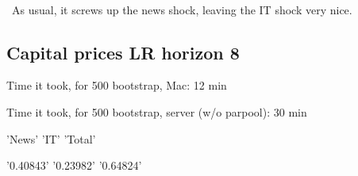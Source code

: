 \documentclass{article}
\def \ourFigPath {../}
\begin{document}
	\
	
	
	
	
	\begin{figure}[h!]
\centering
{} \hspace{.2in%
} 
\end{figure}

\
As usual, it screws up the news shock, leaving the IT shock very nice. 



\newpage
\subsection{Capital prices LR horizon 8}
\noindent Time it took, for 500 bootstrap, Mac: 12 min

\noindent  Time it took, for 500 bootstrap, server (w/o parpool): 30 min


\noindent  'News'       'IT'        'Total' 

\noindent  '0.40843'    '0.23982'    '0.64824'




\begin{figure}[h!]
	\centering
	 \hspace{.2in%
	} 
\end{figure}
	
	
		
	
	
\end{document}

